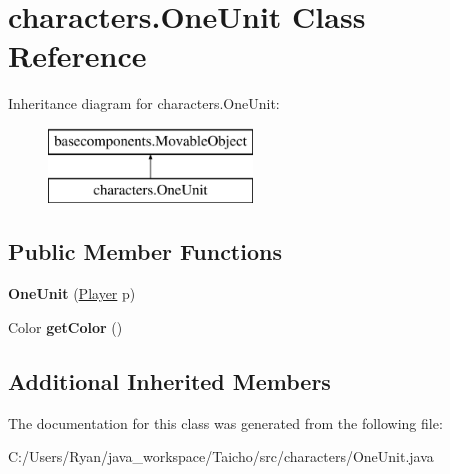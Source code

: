 \hypertarget{classcharacters_1_1_one_unit}{\section{characters.\-One\-Unit Class Reference}
\label{classcharacters_1_1_one_unit}
}
Inheritance diagram for characters.\-One\-Unit\-:\begin{figure}[H]
\begin{center}
\leavevmode
\includegraphics[height=2.000000cm]{classcharacters_1_1_one_unit}
\end{center}
\end{figure}
\subsection*{Public Member Functions}
\begin{DoxyCompactItemize}
\item 
\hypertarget{classcharacters_1_1_one_unit_ac0f756791d62d4e9f8266e209634c88c}{{\bfseries One\-Unit} (\hyperlink{enumenums_1_1_player}{Player} p)}\label{classcharacters_1_1_one_unit_ac0f756791d62d4e9f8266e209634c88c}

\item 
\hypertarget{classcharacters_1_1_one_unit_ac772fe04bc434b780f2c3d7622bfcf7d}{Color {\bfseries get\-Color} ()}\label{classcharacters_1_1_one_unit_ac772fe04bc434b780f2c3d7622bfcf7d}

\end{DoxyCompactItemize}
\subsection*{Additional Inherited Members}


The documentation for this class was generated from the following file\-:\begin{DoxyCompactItemize}
\item 
C\-:/\-Users/\-Ryan/java\-\_\-workspace/\-Taicho/src/characters/One\-Unit.\-java\end{DoxyCompactItemize}
